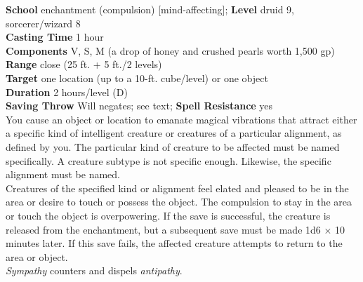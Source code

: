 \textbf{School} enchantment (compulsion) [mind-affecting]; \textbf{Level} druid 9, sorcerer/wizard 8\\
\textbf{Casting Time} 1 hour\\
\textbf{Components} V, S, M (a drop of honey and crushed pearls worth 1,500 gp)\\
\textbf{Range} close (25 ft. + 5 ft./2 levels)\\
\textbf{Target} one location (up to a 10-ft. cube/level) or one object\\
\textbf{Duration} 2 hours/level (D)\\
\textbf{Saving Throw }Will negates; see text; \textbf{Spell Resistance} yes\\
You cause an object or location to emanate magical vibrations that attract either a specific kind of intelligent creature or creatures of a particular alignment, as defined by you. The particular kind of creature to be affected must be named specifically. A creature subtype is not specific enough. Likewise, the specific alignment must be named.\\
Creatures of the specified kind or alignment feel elated and pleased to be in the area or desire to touch or possess the object. The compulsion to stay in the area or touch the object is overpowering. If the save is successful, the creature is released from the enchantment, but a subsequent save must be made 1d6 × 10 minutes later. If this save fails, the affected creature attempts to return to the area or object.\\
\textit{Sympathy }counters and dispels \textit{antipathy}.\\
